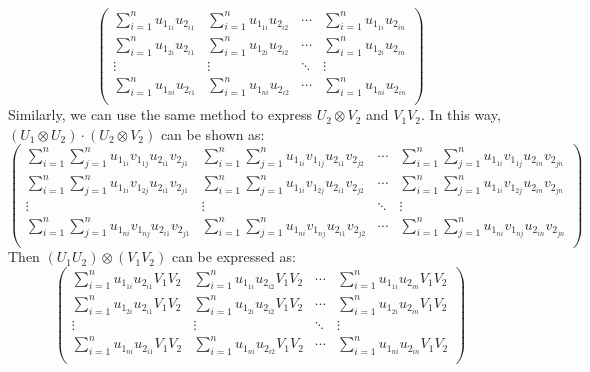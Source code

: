 \documentclass[12pt, a4paper]{article}
\begin{document}
\begin{enumerate}
$$\begin{pmatrix}
              \sum_{i=1}^n u_{1_{1i}}u_{2_{i1}} & \sum_{i=1}^n u_{1_{1i}}u_{2_{i2}} & \cdots & \sum_{i=1}^n u_{1_{1i}}u_{2_{in}}\\
              \sum_{i=1}^n u_{1_{2i}}u_{2_{i1}} & \sum_{i=1}^n u_{1_{2i}}u_{2_{i2}} & \cdots & \sum_{i=1}^n u_{1_{2i}}u_{2_{in}}\\
              \vdots & \vdots & \ddots & \vdots\\
              \sum_{i=1}^n u_{1_{ni}}u_{2_{i1}} & \sum_{i=1}^n u_{1_{ni}}u_{2_{i2}} & \cdots & \sum_{i=1}^n u_{1_{ni}}u_{2_{in}}\\
          \end{pmatrix}
          $$
          Similarly, we can use the same method to express $U_2\otimes V_2$ and $V_1V_2$. In this way, 
          $(U_1\otimes U_2)\cdot(U_2\otimes V_2)$ can be shown as:
          $$
          \begin{pmatrix}
              \sum_{i=1}^n \sum_{j=1}^n u_{1_{1i}}v_{1_{1j}}u_{2_{i1}}v_{2_{j1}} & \sum_{i=1}^n \sum_{j=1}^n u_{1_{1i}}v_{1_{1j}}u_{2_{i1}}v_{2_{j2}} & \cdots & \sum_{i=1}^n \sum_{j=1}^n u_{1_{1i}}v_{1_{1j}}u_{2_{in}}v_{2_{jn}}\\
              \sum_{i=1}^n \sum_{j=1}^n u_{1_{1i}}v_{1_{2j}}u_{2_{i1}}v_{2_{j1}} & \sum_{i=1}^n \sum_{j=1}^n u_{1_{1i}}v_{1_{2j}}u_{2_{i1}}v_{2_{j2}} & \cdots & \sum_{i=1}^n \sum_{j=1}^n u_{1_{1i}}v_{1_{2j}}u_{2_{in}}v_{2_{jn}}\\
              \vdots & \vdots & \ddots & \vdots\\
              \sum_{i=1}^n \sum_{j=1}^n u_{1_{ni}}v_{1_{nj}}u_{2_{i1}}v_{2_{j1}} & \sum_{i=1}^n \sum_{j=1}^n u_{1_{ni}}v_{1_{nj}}u_{2_{i1}}v_{2_{j2}} & \cdots & \sum_{i=1}^n \sum_{j=1}^n u_{1_{ni}}v_{1_{nj}}u_{2_{in}}v_{2_{jn}}\\
          \end{pmatrix}
          $$
          Then $(U_1U_2)\otimes (V_1V_2)$ can be expressed as:
          $$
          \begin{pmatrix}
            \sum_{i=1}^n u_{1_{1i}}u_{2_{i1}}V_1V_2 & \sum_{i=1}^n u_{1_{1i}}u_{2_{i2}}V_1V_2 & \cdots & \sum_{i=1}^n u_{1_{1i}}u_{2_{in}}V_1V_2\\
            \sum_{i=1}^n u_{1_{2i}}u_{2_{i1}}V_1V_2 & \sum_{i=1}^n u_{1_{2i}}u_{2_{i2}}V_1V_2 & \cdots & \sum_{i=1}^n u_{1_{2i}}u_{2_{in}}V_1V_2\\
            \vdots & \vdots & \ddots & \vdots\\
            \sum_{i=1}^n u_{1_{ni}}u_{2_{i1}}V_1V_2 & \sum_{i=1}^n u_{1_{ni}}u_{2_{i2}}V_1V_2 & \cdots & \sum_{i=1}^n u_{1_{ni}}u_{2_{in}}V_1V_2\\

\end{pmatrix}$$
\end{enumerate}
\end{document}
